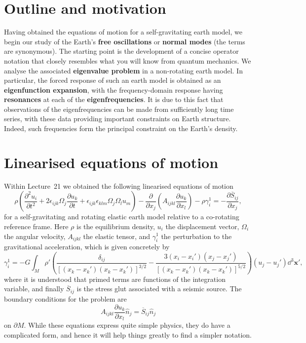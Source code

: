 \section*{Outline and motivation}

Having obtained the equations of motion for a self-gravitating earth model, we begin our study of the Earth's 
\textbf{free oscillations} or \textbf{normal modes} (the terms are synonymous). The starting point is the development of a concise operator 
notation that closely resembles what you will know from quantum mechanics. We analyse the associated \textbf{eigenvalue problem} in a 
non-rotating earth model. In particular, the forced response of such an earth model is obtained as an \textbf{eigenfunction expansion},
with the frequency-domain response having \textbf{resonances} at each of the 
\textbf{eigenfrequencies}. It is due to this fact that observations of the eigenfrequencies can be made from sufficiently long time series, 
with these data providing important constraints on Earth structure. Indeed, such frequencies form the principal constraint on the Earth's density. 

\section*{Linearised equations of motion}

Within Lecture~21 we obtained the following linearised equations of motion
\begin{equation}
\rho\left(\frac{\partial^{2}u_{i}}{\partial t^{2}}+2\epsilon_{ijk}\Omega_{j}\frac{\partial u_{k}}{\partial t}
+\epsilon_{ijk}\epsilon_{klm}\Omega_{j}\Omega_{l}u_{m}\right)-\frac{\partial}{\partial x_{j}}\left(A_{ijkl}\frac{\partial u_{k}}{\partial x_{l}}\right)
-\rho\gamma_{i}^{1}=-\frac{\partial\overline{S}_{ij}}{\partial x_{j}},
\label{eq:1}
\end{equation}
for a self-gravitating and rotating elastic earth model relative to a co-rotating reference frame. Here $\rho$ is the equilibrium density, $u_{i}$ the displacement vector,
 $\Omega_{i}$ the angular velocity, $A_{ijkl}$ the elastic tensor, and $\gamma_{i}^{1}$ the perturbation to the gravitational acceleration, which is given concretely by
\begin{equation}
\gamma_{i}^{1}=-G\int_{M}\rho'\left(\frac{\delta_{ij}}{[(x_{k}-x_{k}')(x_{k}-x_{k}')]^{3/2}}-\frac{3(x_{i}-x_{i}')(x_{j}-x_{j}')}{[(x_{k}-x_{k}')(x_{k}-x_{k}')]^{5/2}}\right)(u_{j}-u_{j}')\dd^{3}\mathbf{x}',
\label{eq:2}
\end{equation}
where it is understood that primed terms are functions of the integration variable, and finally $\overline{S}_{ij}$ is the stress glut associated with a seismic source. 
The boundary conditions for the problem are
\begin{equation}
A_{ijkl}\frac{\partial u_{k}}{\partial x_{l}}\hat{n}_{j}=\overline{S}_{ij}\hat{n}_{j}
\label{eq:3}
\end{equation}
on $\partial M$. While these equations express quite simple physics, they do have a complicated form, and hence it will help things greatly to find a simpler notation.

